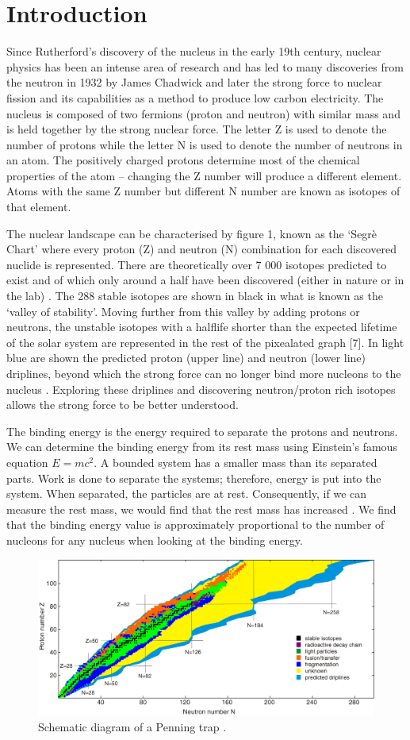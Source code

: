 \section{Introduction}
Since Rutherford’s discovery of the nucleus in the early 19th century,\cite{noauthor_discovery_nodate} nuclear physics has been an intense area of research and has led to many discoveries from the neutron in 1932 by James Chadwick \cite{noauthor_discovery_nodate-1} and later the strong force to nuclear fission and its capabilities as a method to produce low carbon electricity.
The nucleus is composed of two fermions (proton and neutron) with similar mass and is held together by the strong nuclear force.
The letter Z is used to denote the number of protons while the letter N is used to denote the number of neutrons in an atom. The positively charged protons determine most of the chemical properties of the atom – changing the Z number will produce a different element. Atoms with the same Z number but different N number are known as isotopes of that element.

The nuclear landscape can be characterised by figure 1, known as the ‘Segrè Chart’ where every proton (Z) and neutron (N) combination for each discovered nuclide is represented.
There are theoretically over 7 000 isotopes predicted to exist and of which only around a half have been discovered (either in nature or in the lab) \cite{erler_limits_2012}.
The 288 stable isotopes are shown in black in what is known as the ‘valley of stability’.
Moving further from this valley by adding protons or neutrons, the unstable isotopes with a halflife shorter than the expected lifetime of the solar system are represented in the rest of the pixealated graph [7].
In light blue are shown the predicted proton (upper line) and neutron (lower line) driplines, beyond which the strong force can no longer bind more nucleons to the nucleus \cite{noauthor_amazing_nodate}.
Exploring these driplines and discovering neutron/proton rich isotopes allows the strong force to be better understood.

The binding energy is the energy required to separate the protons and neutrons.
We can determine the binding energy from its rest mass using Einstein’s famous equation $E=mc^2$.
A bounded system has a smaller mass than its separated parts.  Work is done to separate the systems; therefore, energy is put into the system.
When separated, the particles are at rest.
Consequently, if we can measure the rest mass, we would find that the rest mass has increased \cite{noauthor_binding_nodate}.
We find that the binding energy value is approximately proportional to the number of nucleons for any nucleus when looking at the binding energy.

\begin{figure}[H]
    \centering
    \includegraphics[width=.48\textwidth]{images/Intro_nuclearlandscape.jpg}
    \caption{Schematic diagram of a Penning trap \cite{famiano_nuclear_2019}.}\label{fig:intronuclan}
\end{figure}